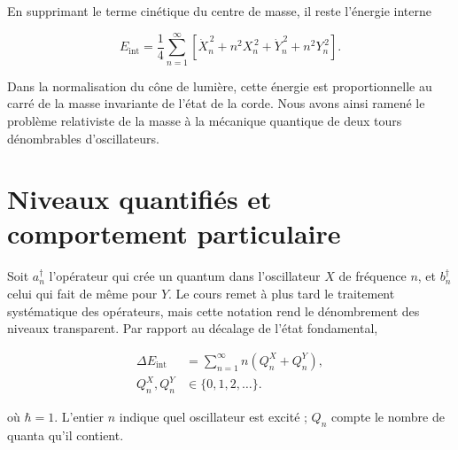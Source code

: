 \begin{classroomqa}
\end{classroomqa}

En supprimant le terme cinétique du centre de masse, il reste l’énergie interne

\begin{equation}
  E_{\mathrm{int}}
  =
  \frac14
  \sum_{n=1}^{\infty}
  \left[
    \dot X_n^{\,2}+n^2X_n^{\,2}
    +\dot Y_n^{\,2}+n^2Y_n^{\,2}
  \right].
  \label{eq:l02-internal-energy}
\end{equation}

Dans la normalisation du cône de lumière, cette énergie est proportionnelle au carré de la masse invariante de l’état de la corde. Nous avons ainsi ramené le problème relativiste de la masse à la mécanique quantique de deux tours dénombrables d’oscillateurs.

\section{Niveaux quantifiés et comportement particulaire}

Soit \(a_n^\dagger\) l’opérateur qui crée un quantum dans l’oscillateur \(X\) de fréquence
\(n\), et \(b_n^\dagger\) celui qui fait de même pour \(Y\). Le cours remet à plus tard le traitement systématique des opérateurs, mais cette notation rend le dénombrement des niveaux transparent. Par rapport au décalage de l’état fondamental,

\begin{equation}
  \begin{aligned}
    \Delta E_{\mathrm{int}}
    &=\sum_{n=1}^{\infty}n\left(Q_n^X+Q_n^Y\right),\\
    Q_n^X,Q_n^Y&\in\{0,1,2,\ldots\}.
  \end{aligned}
  \label{eq:l02-quantized-energy}
\end{equation}

où \(\hbar=1\). L’entier \(n\) indique quel oscillateur est excité ;
\(Q_n\) compte le nombre de quanta qu’il contient.

